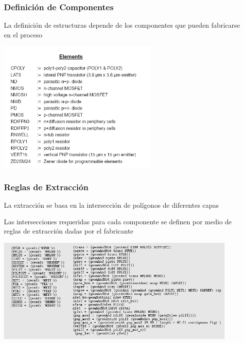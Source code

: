 \documentclass[aspectratio=169,10pt]{beamer}
\begin{document}
\begin{frame}[t]
\frametitle{Definición de Componentes}
La definición de estructuras depende de los componentes que pueden fabricarse en el proceso

\centering
\includegraphics[width=8cm]{components}
\end{frame}


\begin{frame}[t]
\frametitle{Reglas de Extracción}
La extracción se basa en la intersección de polígonos de diferentes capas

\vspace{3mm}
Las intersecciones requeridas para cada componente se definen por medio de reglas de extracción dadas por el fabricante

\vspace{3mm}
\centering
\includegraphics[width=12cm]{extraction}
\end{frame}
\end{document}
